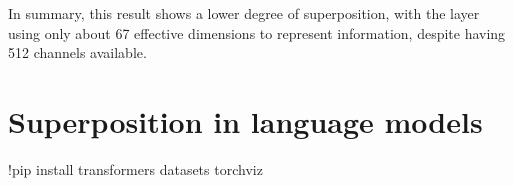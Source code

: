 \documentclass[
  letterpaper,
  DIV=11,
  numbers=noendperiod]{scrreprt}
\newenvironment{Shaded}{\begin{snugshade}}{\end{snugshade}}
\newcommand{\NormalTok}[1]{\textcolor[rgb]{0.00,0.23,0.31}{#1}}
\newcommand{\OperatorTok}[1]{\textcolor[rgb]{0.37,0.37,0.37}{#1}}
\begin{document}
In summary, this result shows a lower degree of superposition, with the
layer using only about 67 effective dimensions to represent information,
despite having 512 channels available.


\chapter{Superposition in language
models}\label{superposition-in-language-models}

\begin{Shaded}
\begin{Highlighting}[]
\OperatorTok{!}\NormalTok{pip install transformers datasets torchviz}
\end{Highlighting}
\end{Shaded}
\end{document}
